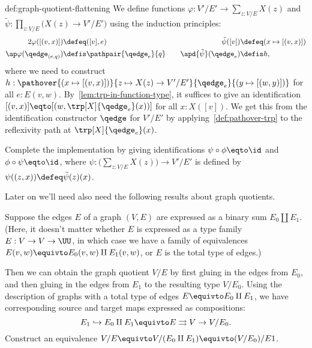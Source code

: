 \begin{implementation}{def:graph-quotient-flattening}
  We define functions $\varphi : V'/E' \to \sum_{z:V/E}X(z)$
  and $\tilde\psi : \prod_{z:V/E}\bigl(X(z) \to V'/E'\bigr)$
  using the induction principles:
  \begin{alignat*}2
    \varphi([(v,x)]) &\defeq ([v],e) &\quad
    \tilde\psi([v]) &\defeq (x \mapsto [(v,x)]) \\
    \ap\varphi(\qedge_{(e,q)}) &\defis \pathpair{\qedge_e}{q} &\quad
    \apd{\tilde\psi}(\qedge_e) &\defis h,
  \end{alignat*}
  where we need to construct
  $h : \pathover{(x \mapsto [(v,x)])}{z \mapsto X(z) \to V'/E'}{\qedge_e}
  {(y \mapsto [(w,y)])}$ for all $e : E(v,w)$.
  By~\cref{lem:trp-in-function-type}, it suffices to give an identification
  $[(v,x)] \eqto [(w,\trp[X]{\qedge_e}(x))]$ for all $x : X([v])$.
  We get this from the identification constructor $\qedge$ for $V'/E'$
  by applying~\cref{def:pathover-trp} to the reflexivity path at
  $\trp[X]{\qedge_e}(x)$.
\end{implementation}
\begin{xca}
  Complete the implementation by giving identifications $\psi\circ\phi\eqto\id$
  and $\phi\circ\psi\eqto\id$, where $\psi : \bigl(\sum_{z:V/E}X(z)\bigr) \to V'/E'$
  is defined by $\psi((z,x)) \defeq \tilde\psi(z)(x)$.
\end{xca}

Later on we'll need also need the following results about graph quotients.
\begin{xca}\label{xca:graph-quotient-in-steps}
  Suppose the edges $E$ of a graph $(V,E)$ are expressed as a binary sum $E_0 \amalg E_1$.
  (Here, it doesn't matter whether $E$ is expressed as a type family $E : V \to V \to \UU$,
  in which case we have a family of equivalences $E(v,w) \equivto E_0(v,w) \amalg E_1(v,w)$,
  or $E$ is the total type of edges.)

  Then we can obtain the graph quotient $V/E$ by first gluing in the edges from $E_0$,
  and then gluing in the edges from $E_1$ to the resulting type $V/E_0$.
  Using the description of graphs with a total type of edges $E \equivto E_0 \amalg E_1$,
  we have corresponding source and target maps expressed as compositions:
  \[
    E_1 \hookrightarrow E_0\amalg E_1 \equivto E \rightrightarrows V \to V/E_0.
  \]
  Construct an equivalence $V/E \equivto V/(E_0 \amalg E_1) \equivto (V/E_0)/E1$.
\end{xca}

